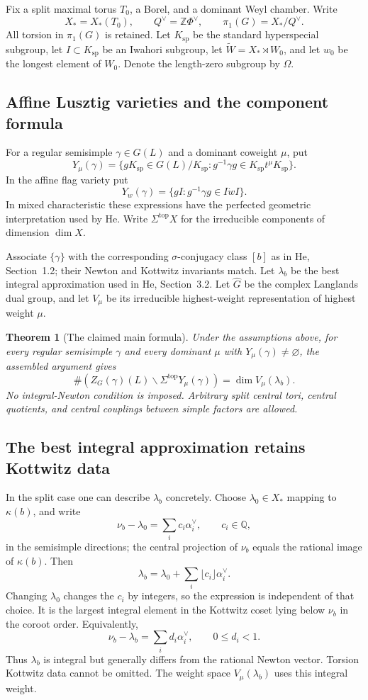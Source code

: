 \documentclass[11pt,a4paper]{article}
\newtheorem{theorem}{Theorem}[section]
\theoremstyle{definition}
\theoremstyle{remark}
\begin{document}
Fix a split maximal torus \(T_0\), a Borel, and a dominant Weyl chamber.
Write
\[
X_*=X_*(T_0),\qquad Q^\vee=\mathbb Z\Phi^\vee,\qquad
\pi_1(G)=X_*/Q^\vee .
\]
All torsion in \(\pi_1(G)\) is retained. Let \(K_{\mathrm{sp}}\) be the
standard hyperspecial subgroup, let \(I\subset K_{\mathrm{sp}}\) be an
Iwahori subgroup, let \(\widetilde W=X_*\rtimes W_0\), and let \(w_0\)
be the longest element of \(W_0\). Denote the length-zero subgroup by
\(\Omega\).

\subsection{Affine Lusztig varieties and the component formula}
For a regular semisimple \(\gamma\in G(L)\) and a dominant coweight
\(\mu\), put
\[
Y_\mu(\gamma)=
\{gK_{\mathrm{sp}}\in G(L)/K_{\mathrm{sp}}:
g^{-1}\gamma g\in K_{\mathrm{sp}}t^\mu K_{\mathrm{sp}}\}.
\]
In the affine flag variety put
\[
Y_w(\gamma)=\{gI:g^{-1}\gamma g\in I\dot wI\}.
\]
In mixed characteristic these expressions have the perfected
geometric interpretation used by He. Write
\(\Sigma^{\mathrm{top}}X\) for the irreducible components of dimension
\(\dim X\).

Associate \(\{\gamma\}\) with the corresponding \(\sigma\)-conjugacy
class \([b]\) as in He, Section~1.2; their Newton and Kottwitz
invariants match. Let \(\lambda_b\) be the best integral approximation
used in He, Section~3.2. Let \(\widehat G\) be the complex Langlands
dual group, and let \(V_\mu\) be its irreducible highest-weight
representation of highest weight \(\mu\).

\begin{theorem}[The claimed main formula]\label{thm:main}
Under the assumptions above, for every regular semisimple \(\gamma\)
and every dominant \(\mu\) with \(Y_\mu(\gamma)\ne\varnothing\), the
assembled argument gives
\[
\boxed{
\#\left(
Z_G(\gamma)(L)\backslash
\Sigma^{\mathrm{top}}Y_\mu(\gamma)
\right)
=\dim V_\mu(\lambda_b).
}
\]
No integral-Newton condition is imposed. Arbitrary split central
tori, central quotients, and central couplings between simple
factors are allowed.
\end{theorem}

\subsection{The best integral approximation retains Kottwitz data}
In the split case one can describe \(\lambda_b\) concretely. Choose
\(\lambda_0\in X_*\) mapping to \(\kappa(b)\), and write
\[
\nu_b-\lambda_0=\sum_i c_i\alpha_i^\vee,\qquad c_i\in\mathbb Q,
\]
in the semisimple directions; the central projection of \(\nu_b\)
equals the rational image of \(\kappa(b)\). Then
\[
\lambda_b=\lambda_0+\sum_i\lfloor c_i\rfloor\alpha_i^\vee.
\]
Changing \(\lambda_0\) changes the \(c_i\) by integers, so the
expression is independent of that choice. It is the largest integral
element in the Kottwitz coset lying below \(\nu_b\) in the coroot
order. Equivalently,
\[
\nu_b-\lambda_b=\sum_i d_i\alpha_i^\vee,\qquad 0\le d_i<1.
\]
Thus \(\lambda_b\) is integral but generally differs from the rational
Newton vector. Torsion Kottwitz data cannot be omitted. The weight
space \(V_\mu(\lambda_b)\) uses this integral weight.
\end{document}
